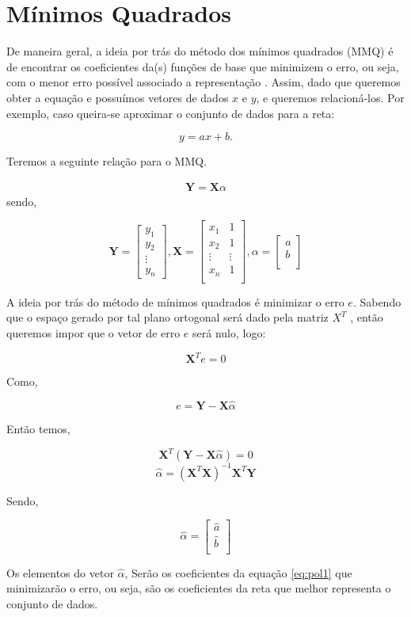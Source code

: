 \section{Mínimos Quadrados}
\label{sec:MMQ}
De maneira geral, a ideia por trás do método dos mínimos quadrados (MMQ)  é de encontrar os coeficientes da(s) funções de base que minimizem o erro, ou seja, com o menor erro possível associado a representação \cite{MMQ}. Assim, dado que queremos obter a equação e possuímos vetores de dados $x$ e $y$, e queremos relacioná-los. Por exemplo, caso queira-se aproximar o conjunto de dados para a reta:

\begin{equation}
    y = ax + b.
    \label{eq:pol1}
\end{equation}

Teremos a seguinte relação para o MMQ.

\begin{align*}
    \textbf{Y} = \textbf{X}\alpha
\end{align*}
sendo,

\begin{equation*}
    \textbf{Y} =
    \begin{bmatrix}
     y_1\\
     y_2\\
     \vdots\\
     y_n
    \end{bmatrix},
    \textbf{X} = 
    \begin{bmatrix}
        x_1 & 1\\
        x_2 & 1\\
        \vdots & \vdots\\
        x_n & 1\\
    \end{bmatrix},
    \alpha =
    \begin{bmatrix}
        a\\
        b\\
    \end{bmatrix}
\end{equation*}

A ideia por trás do método de mínimos quadrados é minimizar o erro $e$. Sabendo que o espaço gerado por tal plano ortogonal será dado pela matriz $X^T$ , então queremos impor que o vetor
de erro $e$ será nulo, logo:

\[\textbf{X}^Te = 0\]

Como,

\[e = \textbf{Y} - \textbf{X}\hat{\alpha}\]

Então temos,

\[\textbf{X}^T(\textbf{Y} - \textbf{X}\hat{\alpha})= 0\]
\[\hat{\alpha} = (\textbf{X}^T\textbf{X})^{-1}\textbf{X}^T\textbf{Y} \]

Sendo,

\[\hat{\alpha} = 
\begin{bmatrix}
 \hat{a}\\
 \hat{b}\\
\end{bmatrix}
\]

Os elementos do vetor $\hat{\alpha}$, Serão os coeficientes da equação \ref{eq:pol1} que minimizarão o erro, ou seja, são os coeficientes da reta que melhor representa o conjunto de dados.